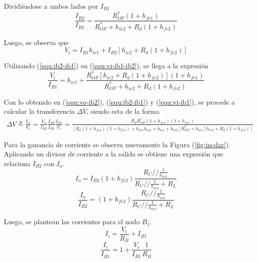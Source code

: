 Dividiéndose a ambos lados por $I_{B1}$
\begin{equation}
	\frac{I_{B2}}{I_{B1}} = \frac{R_{OF}^* \left( 1 + h_{fe1} \right)}{R_{OF}^* + h_{ie2} + R_d \left( 1 + h_{fe2} \right)} 
\label{equ:ib2-ib1}
\end{equation}

Luego, se observa que
\begin{equation}
	V_i = I_{B1} h_{ie1} + I_{B2} \left[ h_{ie2} + R_d \left( 1 + h_{fe2} \right) \right]
\label{equ:vi-ib1-ib2}
\end{equation}

Utilizando (\ref{equ:ib2-ib1}) en (\ref{equ:vi-ib1-ib2}), se llega a la expresión
\begin{equation}
	\frac{V_i}{I_{B1}} =  h_{ie1} + \frac{ R_{OF}^* \left[ h_{ie2} + R_d \left( 1 + h_{fe2} \right) \right] \left( 1 + h_{fe1} \right)}{R_{OF}^* + h_{ie2} + R_d \left( 1 + h_{fe2} \right)}
\label{equ:vi-ib1}
\end{equation}

Con lo obtenido en (\ref{equ:vo-ib2}), (\ref{equ:ib2-ib1}) y (\ref{equ:vi-ib1}), se procede a calcular la transferencia $\Delta V$, siendo esta de la forma
\begin{equation}
\begin{split}
	\Delta V \triangleq \frac{V_o}{V_i} = \frac{V_o}{I_{B2}} \frac{I_{B2}}{I_{B1}} \frac{I_{B1}}{V_i} = \frac {R_d R_{OF}^* \left( 1+h_{fe2} \right) \left( 1+h_{fe1} \right) }{ \left[ R_d \left( 1+h_{fe2} \right) \left( 1+h_{fe1} \right) +h_{fe1}h_{ie2}+h_{ie1}+h_{ie2} \right] R_{OF}^*+h_{ie1} \left[ h_{ie2}+R_d \left( 1+h_{fe2} \right)  \right] }
\end{split}
\label{equ:v}
\end{equation}

Para la ganancia de corriente se observa nuevamente la Figura (\ref{fig:incdar}). Aplicando un divisor de corriente a la salida se obtiene una expresión que relaciona $I_{B2}$ con $I_o$.
\begin{equation*}
	I_o = I_{B2} \left( 1 + h_{fe2} \right) \frac{R_C // \frac{1}{h_{oe2}}}{R_C // \frac{1}{h_{oe2}} + R_L}
\end{equation*}
\begin{equation}
	\frac{I_o}{I_{B2}} = \left( 1 + h_{fe2} \right) \frac{R_C // \frac{1}{h_{oe2}}}{R_C // \frac{1}{h_{oe2}} + R_L}
	\label{equ:io-ib2}
\end{equation}

Luego, se plantean las corrientes para el nodo $B_1$.
\begin{equation*}
	I_i = \frac{V_i}{R_B} + I_{B1}
\end{equation*}
\begin{equation}
	\frac{I_i}{I_{B1}} = 1 + \frac{V_i}{I_{B1}} \frac{1}{R_B}
\label{equ:ii-ib1}
\end{equation}

